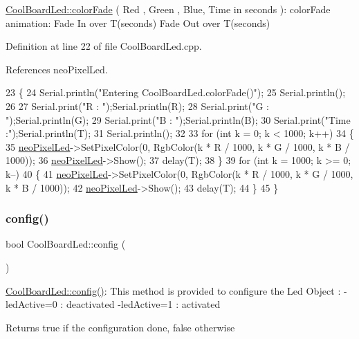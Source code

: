 \hyperlink{classCoolBoardLed_a6dbfe23988f43e1242cd05e69b13ff30}{Cool\+Board\+Led\+::color\+Fade} ( Red , Green , Blue, Time in seconds )\+: color\+Fade animation\+: Fade In over T(seconds) Fade Out over T(seconds) 

Definition at line 22 of file Cool\+Board\+Led.\+cpp.



References neo\+Pixel\+Led.


\begin{DoxyCode}
23 \{
24     Serial.println(\textcolor{stringliteral}{"Entering CoolBoardLed.colorFade()"});
25     Serial.println();
26 
27     Serial.print(\textcolor{stringliteral}{"R : "});Serial.println(R);
28     Serial.print(\textcolor{stringliteral}{"G : "});Serial.println(G);
29     Serial.print(\textcolor{stringliteral}{"B : "});Serial.println(B);
30     Serial.print(\textcolor{stringliteral}{"Time :"});Serial.println(T);
31     Serial.println();   
32 
33     \textcolor{keywordflow}{for} (\textcolor{keywordtype}{int} k = 0; k < 1000; k++) 
34     \{
35         \hyperlink{classCoolBoardLed_ac2c13fa462a010cd9242bf297c013923}{neoPixelLed}->SetPixelColor(0, RgbColor(k * R / 1000, k * G / 1000, k * B / 1000));
36         \hyperlink{classCoolBoardLed_ac2c13fa462a010cd9242bf297c013923}{neoPixelLed}->Show();
37         delay(T);
38     \}
39     \textcolor{keywordflow}{for} (\textcolor{keywordtype}{int} k = 1000; k >= 0; k--) 
40     \{
41         \hyperlink{classCoolBoardLed_ac2c13fa462a010cd9242bf297c013923}{neoPixelLed}->SetPixelColor(0, RgbColor(k * R / 1000, k * G / 1000, k * B / 1000));
42         \hyperlink{classCoolBoardLed_ac2c13fa462a010cd9242bf297c013923}{neoPixelLed}->Show();
43         delay(T);
44     \}
45 \}
\end{DoxyCode}
\mbox{\label{classCoolBoardLed_a1b60e5e30bea96c49ed62ed1bf1ffc8b}} 
\subsubsection{\texorpdfstring{config()}{config()}}
{\footnotesize\ttfamily bool Cool\+Board\+Led\+::config (\begin{DoxyParamCaption}{ }\end{DoxyParamCaption})}

\hyperlink{classCoolBoardLed_a1b60e5e30bea96c49ed62ed1bf1ffc8b}{Cool\+Board\+Led\+::config()}\+: This method is provided to configure the Led Object \+: -\/led\+Active=0 \+: deactivated -\/led\+Active=1 \+: activated \begin{DoxyReturn}{Returns}
true if the configuration done, false otherwise 
\end{DoxyReturn}


